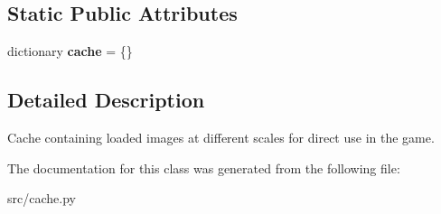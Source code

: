 \subsection*{\-Static \-Public \-Attributes}
\begin{DoxyCompactItemize}
\item 
\hypertarget{classsrc_1_1cache_1_1_image_cache_abf4f360706061a9524b39be34cdf711e}{dictionary {\bfseries cache} = \{\}}\label{classsrc_1_1cache_1_1_image_cache_abf4f360706061a9524b39be34cdf711e}

\end{DoxyCompactItemize}


\subsection{\-Detailed \-Description}
\begin{DoxyVerb}
Cache containing loaded images at different scales for direct use
in the game.
\end{DoxyVerb}
 

\-The documentation for this class was generated from the following file\-:\begin{DoxyCompactItemize}
\item 
src/cache.\-py\end{DoxyCompactItemize}

